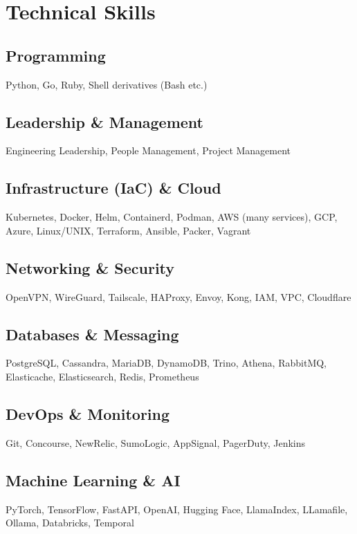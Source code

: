 \documentclass[]{resume}
\begin{document}
\hfill
\begin{minipage}[t]{0.33\textwidth}


\section{Technical Skills}
\subsection{Programming}
Python, Go, Ruby, Shell derivatives (Bash etc.)
\sectionsep

\subsection{Leadership \& Management}
Engineering Leadership, People Management, Project Management
\sectionsep

\subsection{Infrastructure (IaC) \& Cloud}
Kubernetes, Docker, Helm, Containerd, Podman, AWS (many services), GCP, Azure, Linux/UNIX, Terraform, Ansible, Packer, Vagrant
\sectionsep

\subsection{Networking \& Security}
OpenVPN, WireGuard, Tailscale, HAProxy, Envoy, Kong, IAM, VPC, Cloudflare
\sectionsep

\subsection{Databases \& Messaging}
PostgreSQL, Cassandra, MariaDB, DynamoDB, Trino, Athena, RabbitMQ, Elasticache, Elasticsearch, Redis, Prometheus
\sectionsep

\subsection{DevOps \& Monitoring}
Git, Concourse, NewRelic, SumoLogic, AppSignal, PagerDuty, Jenkins
\sectionsep

\subsection{Machine Learning \& AI}
PyTorch, TensorFlow, FastAPI, OpenAI, Hugging Face, LlamaIndex, LLamafile, Ollama, Databricks, Temporal
\sectionsep


\end{minipage}
\end{document}
